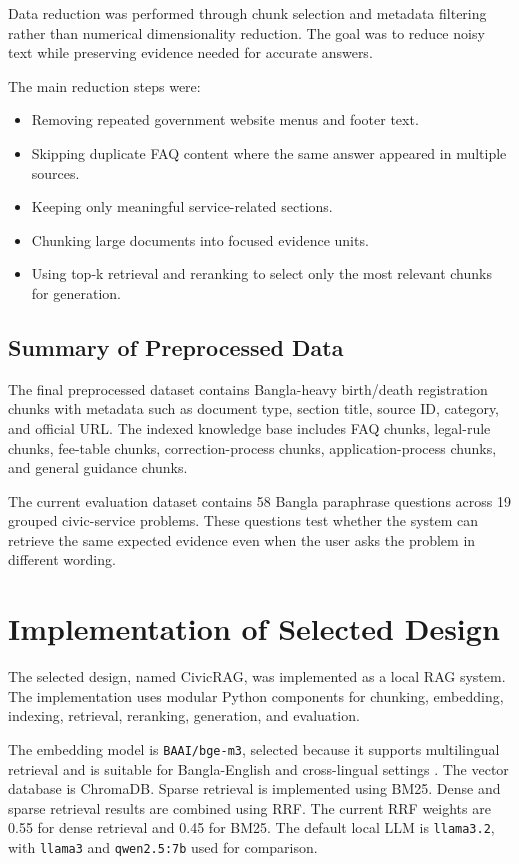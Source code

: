 Data reduction was performed through chunk selection and metadata filtering rather than numerical dimensionality reduction. The goal was to reduce noisy text while preserving evidence needed for accurate answers.

The main reduction steps were:

\begin{itemize}
    \item Removing repeated government website menus and footer text.
    \item Skipping duplicate FAQ content where the same answer appeared in multiple sources.
    \item Keeping only meaningful service-related sections.
    \item Chunking large documents into focused evidence units.
    \item Using top-k retrieval and reranking to select only the most relevant chunks for generation.
\end{itemize}

\subsection{Summary of Preprocessed Data}

The final preprocessed dataset contains Bangla-heavy birth/death registration chunks with metadata such as document type, section title, source ID, category, and official URL. The indexed knowledge base includes FAQ chunks, legal-rule chunks, fee-table chunks, correction-process chunks, application-process chunks, and general guidance chunks.

The current evaluation dataset contains 58 Bangla paraphrase questions across 19 grouped civic-service problems. These questions test whether the system can retrieve the same expected evidence even when the user asks the problem in different wording.

\section{Implementation of Selected Design}

The selected design, named CivicRAG, was implemented as a local RAG system. The implementation uses modular Python components for chunking, embedding, indexing, retrieval, reranking, generation, and evaluation.

The embedding model is \texttt{BAAI/bge-m3}, selected because it supports multilingual retrieval and is suitable for Bangla-English and cross-lingual settings \cite{chen2024bgem3}. The vector database is ChromaDB. Sparse retrieval is implemented using BM25. Dense and sparse retrieval results are combined using RRF. The current RRF weights are 0.55 for dense retrieval and 0.45 for BM25. The default local LLM is \texttt{llama3.2}, with \texttt{llama3} and \texttt{qwen2.5:7b} used for comparison.

